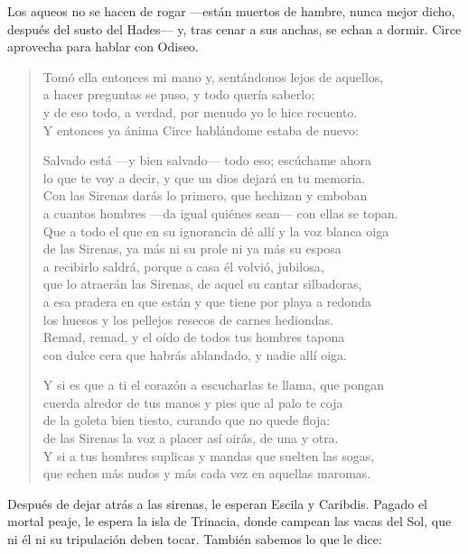 Los aqueos no se hacen de rogar ---están muertos de hambre, nunca mejor dicho, después del susto del Hades--- y, tras cenar a sus anchas, se echan a dormir. Circe aprovecha para hablar con Odiseo.

\begin{verse}
Tomó ella entonces mi mano y, sentándonos lejos de aquellos,\\
a hacer preguntas se puso, y todo quería saberlo;\\
y de eso todo, a verdad, por menudo yo le hice recuento.\\
Y entonces ya ánima Circe hablándome estaba de nuevo:

Salvado está ---y bien salvado--- todo eso; escúchame ahora\\
lo que te voy a decir, y que un dios dejará en tu memoria.\\
Con las Sirenas darás lo primero, que hechizan y emboban\\
a cuantos hombres ---da igual quiénes sean--- con ellas se topan.\\
Que a todo el que en su ignorancia dé allí y la voz blanca oiga\\
de las Sirenas, ya más ni su prole ni ya más su esposa\\
a recibirlo saldrá, porque a casa él volvió, jubilosa,\\
que lo atraerán las Sirenas, de aquel su cantar silbadoras,\\
a esa pradera en que están y que tiene por playa a redonda\\
los huesos y los pellejos resecos de carnes hediondas.\\
Remad, remad, y el oído de todos tus hombres tapona\\
con dulce cera que habrás ablandado, y nadie allí oiga.

Y si es que a ti el corazón a escucharlas te llama, que pongan\\
cuerda alredor de tus manos y pies que al palo te coja\\
de la goleta bien tiesto, curando que no quede floja:\\
de las Sirenas la voz a placer así oirás, de una y otra.\\
Y si a tus hombres suplicas y mandas que suelten las sogas,\\
que echen más nudos y más cada vez en aquellas maromas.
\end{verse}

Después de dejar atrás a las sirenas, le esperan Escila y Caribdis. Pagado el mortal peaje, le espera la isla de Trinacia, donde campean las vacas del Sol, que ni él ni su tripulación deben tocar. También sabemos lo que le dice:

